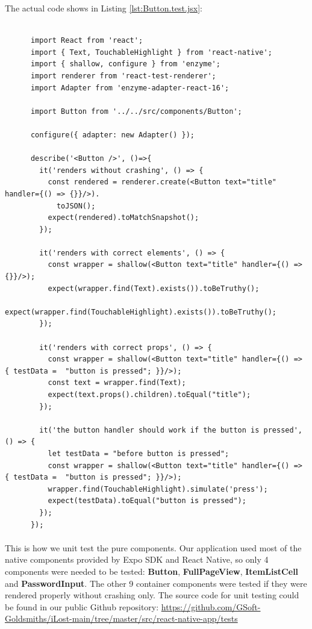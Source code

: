 \documentclass[12pt,a4paper]{article}
\begin{document}
          The actual code shows in Listing \ref{lst:Button.test.jsx}:
          \begin{lstlisting}[caption=Button.test.jsx, label={lst:Button.test.jsx}]
      
      import React from 'react';
      import { Text, TouchableHighlight } from 'react-native';
      import { shallow, configure } from 'enzyme';
      import renderer from 'react-test-renderer';
      import Adapter from 'enzyme-adapter-react-16';

      import Button from '../../src/components/Button';

      configure({ adapter: new Adapter() });

      describe('<Button />', ()=>{
        it('renders without crashing', () => {
          const rendered = renderer.create(<Button text="title" handler={() => {}}/>).
            toJSON();
          expect(rendered).toMatchSnapshot();
        });
        
        it('renders with correct elements', () => {
          const wrapper = shallow(<Button text="title" handler={() => {}}/>);
          expect(wrapper.find(Text).exists()).toBeTruthy();
          expect(wrapper.find(TouchableHighlight).exists()).toBeTruthy();
        });

        it('renders with correct props', () => {
          const wrapper = shallow(<Button text="title" handler={() => { testData =  "button is pressed"; }}/>);
          const text = wrapper.find(Text);
          expect(text.props().children).toEqual("title");
        });

        it('the button handler should work if the button is pressed', () => {
          let testData = "before button is pressed";
          const wrapper = shallow(<Button text="title" handler={() => { testData =  "button is pressed"; }}/>);
          wrapper.find(TouchableHighlight).simulate('press');
          expect(testData).toEqual("button is pressed");
        });
      });

          \end{lstlisting}

          \paragraph{} This is how we unit test the pure components. Our application used most of the native components provided by Expo SDK and React Native, so only 4 components were needed to be tested: {\bf Button}, {\bf FullPageView}, {\bf ItemListCell} and {\bf PasswordInput}. The other 9 container components were tested if they were rendered properly without crashing only. The source code for unit testing could be found in our public Github repository: \url{https://github.com/GSoft-Goldsmiths/iLost-main/tree/master/src/react-native-app/tests}
\end{document}
